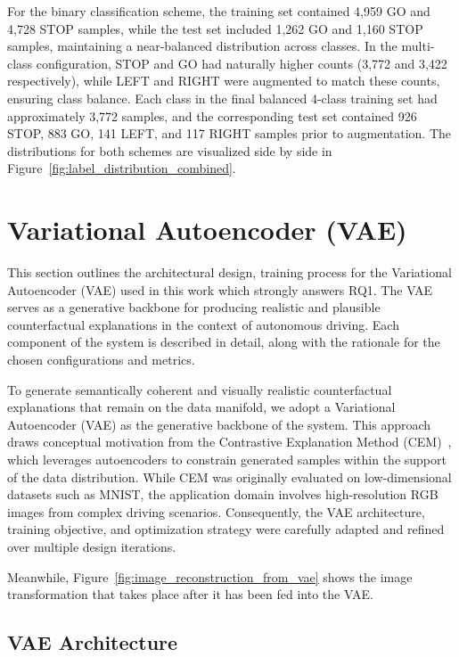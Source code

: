 For the binary classification scheme, the training set contained 4,959 GO and 4,728 STOP samples, while the test set included 1,262 GO and 1,160 STOP samples, maintaining a near-balanced distribution across classes. In the multi-class configuration, STOP and GO had naturally higher counts (3,772 and 3,422 respectively), while LEFT and RIGHT were augmented to match these counts, ensuring class balance. Each class in the final balanced 4-class training set had approximately 3,772 samples, and the corresponding test set contained 926 STOP, 883 GO, 141 LEFT, and 117 RIGHT samples prior to augmentation. The distributions for both schemes are visualized side by side in Figure~\ref{fig:label_distribution_combined}.







\section{Variational Autoencoder (VAE)} \label{sec:vae}

This section outlines the architectural design, training process for the Variational Autoencoder (VAE) used in this work which strongly answers RQ1. The VAE serves as a generative backbone for producing realistic and plausible counterfactual explanations in the context of autonomous driving. Each component of the system is described in detail, along with the rationale for the chosen configurations and metrics.

To generate semantically coherent and visually realistic counterfactual explanations that remain on the data manifold, we adopt a Variational Autoencoder (VAE) as the generative backbone of the system. This approach draws conceptual motivation from the Contrastive Explanation Method (CEM)~\cite{DBLP:journals/corr/abs-1802-07623}, which leverages autoencoders to constrain generated samples within the support of the data distribution. While CEM was originally evaluated on low-dimensional datasets such as MNIST, the application domain involves high-resolution RGB images from complex driving scenarios. Consequently, the VAE architecture, training objective, and optimization strategy were carefully adapted and refined over multiple design iterations.

Meanwhile, Figure~\ref{fig:image_reconstruction_from_vae} shows the image transformation that takes place after it has been fed into the VAE. 

\subsection{VAE Architecture} \label{sec:vae_architecture}

